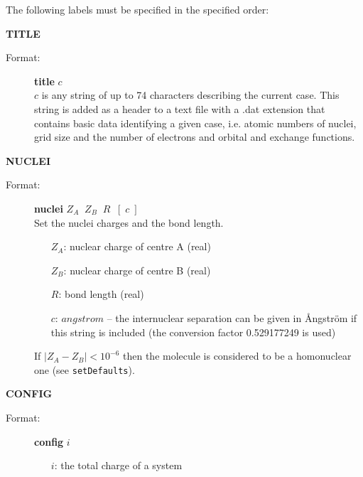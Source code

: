 \documentclass[12pt,a4paper]{article}
\newcommand{\ft}[1]{\texttt{#1}}
\begin{document}
The following labels must be specified in the specified order:
\begin{description}
\item \textbf{TITLE}
\begin{description}
\item[Format:] \textbf{title} $c$ \\ $c$ is any string of up to 74
  characters describing the current case. This string is added as a
  header to a text file with a .dat extension that contains basic data
  identifying a given case, i.e. atomic numbers of nuclei, grid size
  and the number of electrons and orbital and exchange functions.
\end{description}

\item \textbf{NUCLEI}
\begin{description}
\item[Format:] \textbf{nuclei} $Z_A \;\;Z_B\;\; R \;\;[\; c\;]$ \\
  Set the nuclei charges and the bond length.

\begin{itemize}
\item[$Z_A$:] nuclear charge of centre A (real)
\item[$Z_B$:] nuclear charge of centre B (real)
\item[$R$:] bond length (real)
\item[$c$:] $angstrom$ -- the internuclear separation can be given in
  \AA{}ngstr\"om if this string is included (the conversion factor
  0.529177249 is used)
\end{itemize}
  If $|Z_A-Z_B|<10^{-6}$ then the molecule is considered to be a
  homonuclear one (see \ft{setDefaults}).
\end{description}

\item \textbf{CONFIG}
\begin{description}
\item[Format:] \textbf{config} $i$
\begin{itemize}
\item[$i$:] the total charge of a system
\end{itemize}
\end{description}


\end{description}
\end{document}

